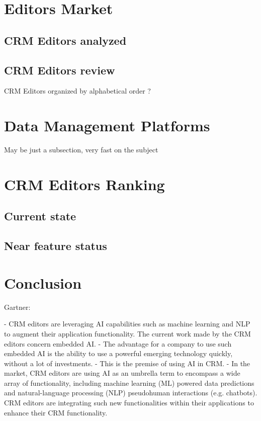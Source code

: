 \section{Editors Market}


\subsection{CRM Editors analyzed}


\subsection{CRM Editors review}
CRM Editors organized by alphabetical order ?

\section{Data Management Platforms}
May be just a subsection, very fast on the subject


\section{CRM Editors Ranking}


\subsection{Current state}


\subsection{Near feature status}


\section{Conclusion}

Gartner:

    - CRM editors are leveraging AI capabilities such as machine learning and NLP to augment their application functionality. The current work made by the CRM editors concern embedded AI.
    - The advantage for a company to use such embedded AI is the ability to use a powerful emerging technology quickly, without a lot of investments. 
    - This is the premise of using AI in CRM.
    - In the market, CRM editors are using AI as an umbrella term to encompass a wide array of functionality, including machine learning (ML) powered data predictions and natural-language processing (NLP) pseudohuman interactions (e.g. chatbots).  CRM editors are integrating such new functionalities within their applications to enhance their CRM functionality.


